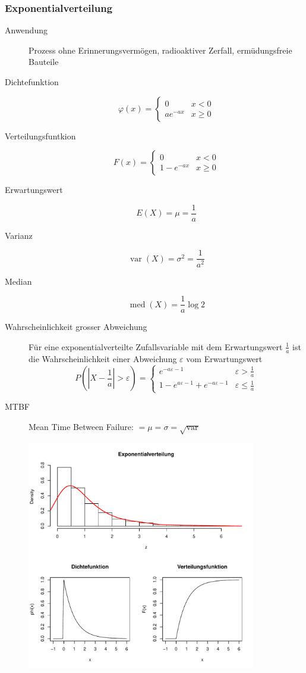 \subsubsection{Exponentialverteilung}
\begin{description}
  \item[Anwendung] Prozess ohne Erinnerungsvermögen, radioaktiver
  Zerfall, ermüdungsfreie Bauteile
  \item[Dichtefunktion] \[\varphi(x) = \begin{cases}0 & x < 0 \\ ae^{-ax} &
    x \geq 0\end{cases}\]
  \item[Verteilungsfuntkion] \[F(x) = \begin{cases}0 & x < 0 \\
    1-e^{-ax} & x \geq 0\end{cases}\]
  \item[Erwartungswert] \[E(X) = \mu = \frac{1}{a}\]
  \item[Varianz] \[\operatorname{var}(X) = \sigma^2 = \frac{1}{a^2}\]
  \item[Median] \[\operatorname{med}(X) = \frac{1}{a}\log 2\]
  \item[Wahrscheinlichkeit grosser Abweichung] Für eine
    exponentialverteilte Zufallsvariable mit dem Erwartungswert
    $\frac{1}{a}$ ist die Wahrscheinlichkeit einer Abweichung
    $\varepsilon$ vom Erwartungswert \[P(|X-\frac{1}{a}| > \varepsilon) =
    \begin{cases}e^{-a\varepsilon-1} & \varepsilon > \frac{1}{a} \\
    1 - e^{a\varepsilon-1} + e^{-a\varepsilon-1} & \varepsilon \leq
    \frac{1}{a}\end{cases}\]
  \item[MTBF] Mean Time Between Failure:
    $= \mu = \sigma = \sqrt{\operatorname{var}}$
\end{description}
\begin{figure}[!htbp]
  \centering
  \includegraphics[width=10cm]{images/exponentialverteilung.pdf}
\end{figure}

